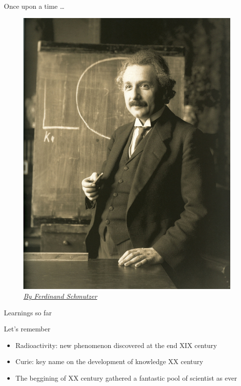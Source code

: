 \begin{frame}{Once upon a time \ldots}

\begin{figure}
\includegraphics[scale=0.25]{figures/Einstein_1921}
\caption*{\href{By Ferdinand Schmutzer - http://www.bhm.ch/de/news_04a.cfm?bid=4&jahr=2006 [dead link], archived copy (image), Public Domain, https://commons.wikimedia.org/w/index.php?curid=34239518}{\emph{By Ferdinand Schmutzer}}}
\end{figure}

\end{frame}

\begin{frame}{Learnings so far}

\begin{alertblock}{Let's remember}

\begin{itemize}

\pause \item Radioactivity: new phenomenon discovered at the end XIX century

\pause \item Curie: key name on the development of knowledge XX century

\pause \item The beggining of XX century gathered a fantastic pool of scientist as ever

\end{itemize}

\end{alertblock}

\end{frame}

